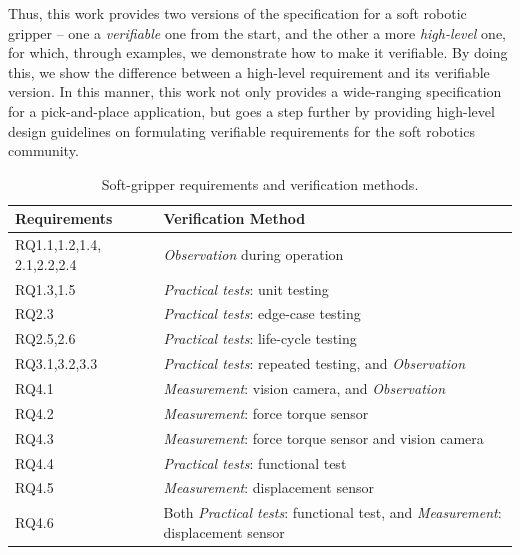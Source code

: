 \documentclass[letterpaper, 10 pt, conference]{ieeeconf}  %
\begin{document}
	Thus, this work provides two versions of the specification for a soft robotic gripper -- one a \emph{verifiable} one from the start, and the other a more \emph{high-level} one, for which, through examples, we demonstrate how to make it verifiable. 
	By doing this, we show the difference between a high-level requirement and its verifiable version. 
	In this manner, this work not only provides a wide-ranging specification for a pick-and-place application, but goes a step further by providing high-level design guidelines on formulating verifiable requirements for the soft robotics community. %
	
	\begin{table}%
		\centering
		\caption{\label{Table:Verifiability} Soft-gripper requirements and verification methods.}
		\begin{tabular}{|p{16mm}|p{65mm}|}
			\hline
			\textbf{Requirements} & \textbf{Verification Method} \\ 
			\hline
			RQ1.1,1.2,1.4, 2.1,2.2,2.4 & \emph{Observation} during operation\\%
			\hline
			RQ1.3,1.5 & \emph{Practical tests}: unit testing  \\
			\hline
			RQ2.3 & \emph{Practical tests}: edge-case testing \\
			\hline
			RQ2.5,2.6 & \emph{Practical tests}: life-cycle testing \\
			\hline
			RQ3.1,3.2,3.3 & \emph{Practical tests}: repeated testing, and \emph{Observation} \\
			\hline
			RQ4.1 & \emph{Measurement}: vision camera, and \emph{Observation}  \\ 
			\hline
			RQ4.2 & \emph{Measurement}: force torque sensor \\ 
			\hline
			RQ4.3 & \emph{Measurement}: force torque sensor and vision camera  \\ 
			\hline
			RQ4.4 & \emph{Practical tests}: functional test\\ 
			\hline
			RQ4.5 & \emph{Measurement}: displacement sensor   \\ 
			\hline
			RQ4.6 & Both \emph{Practical tests}: functional test, and \emph{Measurement}: displacement sensor \\ 
			\hline
		\end{tabular}\vspace{-3ex}
	\end{table}
\end{document}
